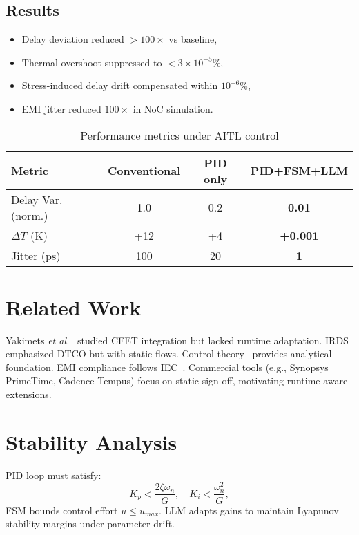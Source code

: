 \documentclass[conference]{IEEEtran}
\begin{document}
\subsection{Results}
\begin{itemize}
  \item Delay deviation reduced $>100\times$ vs baseline,
  \item Thermal overshoot suppressed to $<3\times 10^{-5}\%$,
  \item Stress-induced delay drift compensated within $10^{-6}\%$,
  \item EMI jitter reduced $100\times$ in NoC simulation.
\end{itemize}

\begin{table}[t]
\centering
\caption{Performance metrics under AITL control}
\label{tab:perf}
\begin{tabular}{lccc}
\hline
Metric & Conventional & PID only & PID+FSM+LLM \\
\hline
Delay Var. (norm.) & 1.0 & 0.2 & \textbf{0.01} \\
$\Delta T$ (K)     & +12 & +4  & \textbf{+0.001} \\
Jitter (ps)        & 100 & 20  & \textbf{1} \\
\hline
\end{tabular}
\end{table}

\section{Related Work}
Yakimets \textit{et al.}~\cite{yakimets2020cfet} studied CFET integration but lacked runtime adaptation.
IRDS~\cite{irds2023} emphasized DTCO but with static flows.
Control theory~\cite{franklin2015feedback,khalil2002nonlinear,anderson2007optimal} provides analytical foundation.
EMI compliance follows IEC~\cite{iec61000}.
Commercial tools (e.g., Synopsys PrimeTime, Cadence Tempus) focus on static sign-off, motivating runtime-aware extensions.

\section{Stability Analysis}
PID loop must satisfy:
\begin{equation}
K_p < \frac{2\zeta\omega_n}{G}, \quad K_i < \frac{\omega_n^2}{G},
\end{equation}
FSM bounds control effort $u \le u_{max}$.
LLM adapts gains to maintain Lyapunov stability margins under parameter drift.
\end{document}
